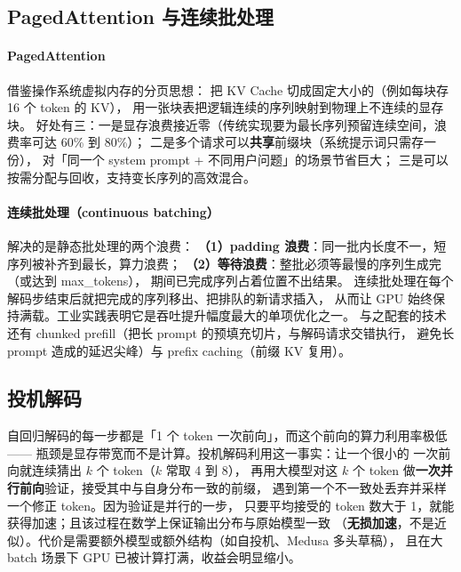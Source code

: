 \subsection{PagedAttention 与连续批处理}

\paragraph{PagedAttention} 借鉴操作系统虚拟内存的分页思想：
把 KV Cache 切成固定大小的（例如每块存 16 个 token 的 KV），
用一张块表把逻辑连续的序列映射到物理上不连续的显存块。
好处有三：一是显存浪费接近零（传统实现要为最长序列预留连续空间，浪费率可达 60\% 到 80\%）；
二是多个请求可以\textbf{共享}前缀块（系统提示词只需存一份），
对「同一个 system prompt + 不同用户问题」的场景节省巨大；
三是可以按需分配与回收，支持变长序列的高效混合。

\paragraph{连续批处理（continuous batching）} 解决的是静态批处理的两个浪费：
\textbf{（1）padding 浪费}：同一批内长度不一，短序列被补齐到最长，算力浪费；
\textbf{（2）等待浪费}：整批必须等最慢的序列生成完（或达到 max\_tokens），
期间已完成序列占着位置不出结果。
连续批处理在每个解码步结束后就把完成的序列移出、把排队的新请求插入，
从而让 GPU 始终保持满载。工业实践表明它是吞吐提升幅度最大的单项优化之一。
与之配套的技术还有 chunked prefill（把长 prompt 的预填充切片，与解码请求交错执行，
避免长 prompt 造成的延迟尖峰）与 prefix caching（前缀 KV 复用）。

\subsection{投机解码}

自回归解码的每一步都是「1 个 token 一次前向」，而这个前向的算力利用率极低——
瓶颈是显存带宽而不是计算。投机解码利用这一事实：让一个很小的
一次前向就连续猜出 $k$ 个 token（$k$ 常取 4 到 8），
再用大模型对这 $k$ 个 token 做\textbf{一次并行前向}验证，接受其中与自身分布一致的前缀，
遇到第一个不一致处丢弃并采样一个修正 token。因为验证是并行的一步，
只要平均接受的 token 数大于 1，就能获得加速；且该过程在数学上保证输出分布与原始模型一致
（\textbf{无损加速}，不是近似）。代价是需要额外模型或额外结构（如自投机、Medusa 多头草稿），
且在大 batch 场景下 GPU 已被计算打满，收益会明显缩小。

